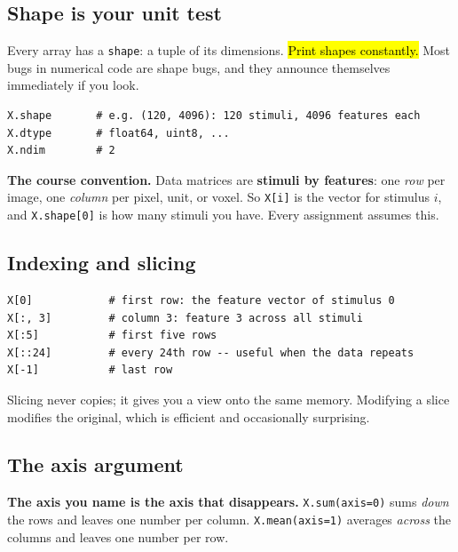 \documentclass[11pt]{article}
\newcommand{\ask}[1]{\textcolor{accent}{\textbf{#1}}}
\begin{document}
\subsection{Shape is your unit test}

Every array has a \texttt{shape}: a tuple of its dimensions. \hl{Print shapes
constantly.} Most bugs in numerical code are shape bugs, and they announce
themselves immediately if you look.

\begin{lstlisting}
X.shape       # e.g. (120, 4096): 120 stimuli, 4096 features each
X.dtype       # float64, uint8, ...
X.ndim        # 2
\end{lstlisting}

\begin{keybox}
\ask{The course convention.} Data matrices are \textbf{stimuli by features}:
one \emph{row} per image, one \emph{column} per pixel, unit, or voxel. So
\texttt{X[i]} is the vector for stimulus $i$, and \texttt{X.shape[0]} is how
many stimuli you have. Every assignment assumes this.
\end{keybox}

\subsection{Indexing and slicing}

\begin{lstlisting}
X[0]            # first row: the feature vector of stimulus 0
X[:, 3]         # column 3: feature 3 across all stimuli
X[:5]           # first five rows
X[::24]         # every 24th row -- useful when the data repeats
X[-1]           # last row
\end{lstlisting}

Slicing never copies; it gives you a view onto the same memory. Modifying a
slice modifies the original, which is efficient and occasionally surprising.

\subsection{The axis argument}

\begin{keybox}
\ask{The axis you name is the axis that disappears.} \texttt{X.sum(axis=0)}
sums \emph{down} the rows and leaves one number per column. \texttt{X.mean(axis=1)}
averages \emph{across} the columns and leaves one number per row.
\end{keybox}
\end{document}
